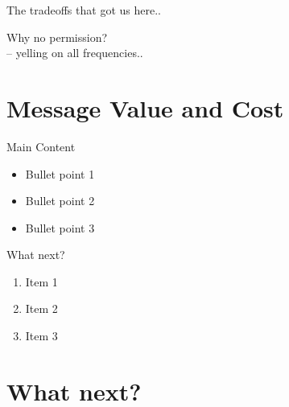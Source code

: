 \documentclass{beamer}
\newcommand{\mydiv}[4]{
  \divider{#1}{#2} (#1-rh.n) node[above] {$#3$}
  (#1-rl.n) node[right] {$#4$} (#1-out)
}
\begin{document}
\begin{frame}{The tradeoffs that got us here..}
\begin{minipage}[t]{0.45\textwidth}
  \end{minipage}%
  \begin{minipage}[t]{0.55\textwidth} %
    \setlength{\parskip}{10pt} %

    \pause
    Why no permission? \\
    \pause
      -- yelling on all frequencies..

  \end{minipage}


\end{frame}



\section{Message Value and Cost}

\begin{frame}{Main Content}

  \begin{itemize}
    \item Bullet point 1
    \item Bullet point 2
    \item Bullet point 3
  \end{itemize}
\end{frame}

\begin{frame}{What next?}


  \begin{enumerate}
    \item Item 1
    \item Item 2
    \item Item 3
  \end{enumerate}
\end{frame}

\section{What next?}
\end{document}
